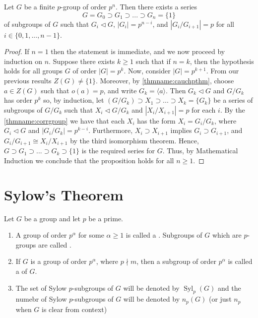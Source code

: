 \documentclass[12pt, a4paper, oneside, openright, titlepage]{book}
\begin{document}
\begin{thm}
    Let $G$ be a finite $p$-group of order $p^n$. Then there exists a series \begin{equation*}
        G = G_0 \supset G_1\supset ...\supset G_n = \{1\}
    \end{equation*}
    of subgroups of $G$ such that $G_i \vartriangleleft G$, $|G_i| = p^{n-i}$, and $|G_i/G_{i+1}| = p$ for all $i \in \{0,1,...,n-1\}$.
\end{thm}
\begin{proof}
    If $n = 1$ then the statement is immediate, and we now proceed by induction on $n$. Suppose there exists $k \geq 1$ such that if $n = k$, then the hypothesis holds for all groups $G$ of order $|G| = p^k$. Now, consider $|G| = p^{k+1}$. From our previous results $Z(G) \neq \{1\}$. Moreover, by \ref{thmname:cauchpthm}, choose $a \in Z(G)$ such that $o(a) = p$, and write $G_k = \langle a \rangle$. Then $G_k\vartriangleleft G$ and $G/G_k$ has order $p^k$ so, by induction, let $(G/G_k)\supset X_1\supset ... \supset X_k = \{G_k\}$ be a series of subgroups of $G/G_k$ such that $X_i \vartriangleleft G/G_k$ and $|X_i/X_{i+1}| = p$ for each $i$. By the \ref{thmname:corrgroup} we have that each $X_i$ has the form $X_i = G_i/G_k$, where $G_i \vartriangleleft G$ and $|G_i/G_k| = p^{k-i}$. Furthermore, $X_i \supset X_{i+1}$ implies $G_i \supset G_{i+1}$, and $G_i/G_{i+1} \cong X_i/X_{i+1}$ by the third isomorphism theorem. Hence, $G\supset G_1\supset ... \supset G_k \supset \{1\}$ is the required series for $G$. Thus, by Mathematical Induction we conclude that the proposition holds for all $n \geq 1$.
\end{proof}


\section{\textsection Sylow's Theorem}

\begin{defn}
    Let $G$ be a group and let $p$ be a prime.
    \begin{enumerate}
        \item A group of order $p^{\alpha}$ for some $\alpha \geq 1$ is called a . Subgroups of $G$ which are $p$-groups are called .
        \item If $G$ is a group of order $p^{\alpha}$, where $p\nmid m$, then a subgroup of order $p^{\alpha}$ is called a  of $G$.
        \item The set of Sylow $p$-subgroups of $G$ will be denoted by $\operatorname{Syl}_p(G)$ and the numebr of Sylow $p$-subgroups of $G$ will be denoted by $n_p(G)$ (or just $n_p$ when $G$ is clear from context)
    \end{enumerate}
\end{defn}
\end{document}
